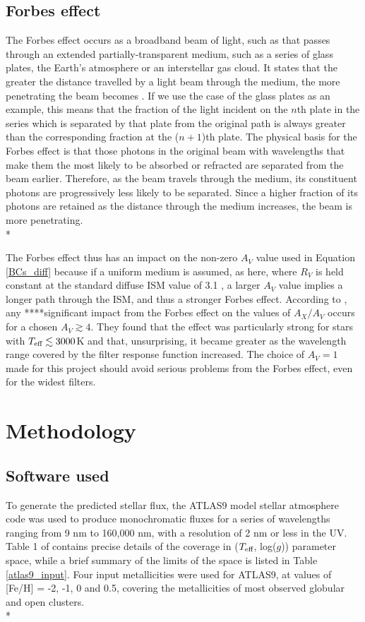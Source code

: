 \documentclass[12pt, a4paper]{report}
\begin{document}
\section{Forbes effect}
The Forbes effect occurs as a broadband beam of light, such as that passes through an extended partially-transparent medium, such as a series of glass plates, the Earth's atmosphere or an interstellar gas cloud. It states that the greater the distance travelled by a light beam through the medium, the more penetrating the beam becomes \citep{1842RSPT..132..225F}. If we use the case of the glass plates as an example, this means that the fraction of the light incident on the $n$th plate in the series which is separated by that plate from the original path is always greater than the corresponding fraction at the ($n+1$)th plate. The physical basis for the Forbes effect is that those photons in the original beam with wavelengths that make them the most likely to be absorbed or refracted are separated from the beam earlier. Therefore, as the beam travels through the medium, its constituent photons are progressively less likely to be separated. Since a higher fraction of its photons are retained as the distance through the medium increases, the beam is more penetrating.\\*

The Forbes effect thus has an impact on the non-zero $A_{V}$ value used in Equation \ref{BCs_diff} because if a uniform medium is assumed, as here, where $R_{V}$ is held constant at the standard diffuse ISM value of 3.1 \citep{1989ApJ...345..245C}, a larger $A_{V}$ value implies a longer path through the ISM, and thus a stronger Forbes effect. According to \cite{2008PASP..120..583G}, any ****significant impact from the Forbes effect on the values of $A_{X}/A_{V}$ occurs for a chosen $A_{V} \gtrsim 4$. They found that the effect was particularly strong for stars with $T_{\textnormal{eff}} \lesssim 3000$K and that, unsurprising, it became greater as the wavelength range covered by the filter response function increased. The choice of $A_{V} = 1$ made for this project should avoid serious problems from the Forbes effect, even for the widest filters.

\chapter{Methodology}
\section{Software used}
To generate the predicted stellar flux, the ATLAS9 model stellar atmosphere code \citep{1993KurCD..13.....K} was used to produce monochromatic fluxes for a series of wavelengths ranging from 9 nm to 160,000 nm, with a resolution of 2 nm or less in the UV.  Table 1 of \cite{2004astro.ph..5087C} contains precise details of the coverage in ($T_{\textnormal{eff}}$, log($g$)) parameter space, while a brief summary  of the limits of the space is listed in Table \ref{atlas9_input}. Four input metallicities were used for ATLAS9, at values of [Fe/H] = -2, -1, 0 and 0.5, covering the metallicities of most observed globular and open clusters.\\*
\end{document}
